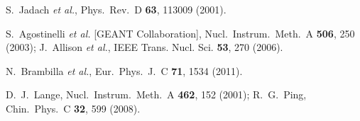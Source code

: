 \begin{thebibliography}{99}
		S.~Jadach {\it et al.},
		Phys.\ Rev.\  D {\bf 63}, 113009 (2001).

		S.~Agostinelli {\it et al.} [GEANT Collaboration],
		Nucl.\ Instrum.\ Meth.\ A {\bf 506}, 250 (2003);
J.~Allison {\it et al.},
		IEEE Trans. Nucl. Sci. {\bf 53}, 270 (2006).


      N.~Brambilla {\it et al.},
      Eur.\ Phys.\ J.\ C {\bf 71}, 1534 (2011).

		D.~J.~Lange,
		Nucl.\ Instrum.\ Meth.\ A {\bf 462}, 152 (2001);
		R.~G.~Ping, Chin.\ Phys.\  C {\bf 32}, 599 (2008).


\end{thebibliography}
